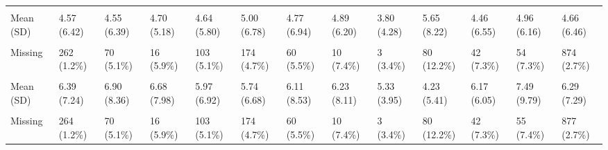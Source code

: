 \documentclass[
  single column]{article}
\begin{document}
\begin{landscape}
\begin{longtable}[t]{lllllllllllll}
\cellcolor{gray!10}{hours\_commute} & \cellcolor{gray!10}{} & \cellcolor{gray!10}{} & \cellcolor{gray!10}{} & \cellcolor{gray!10}{} & \cellcolor{gray!10}{} & \cellcolor{gray!10}{} & \cellcolor{gray!10}{} & \cellcolor{gray!10}{} & \cellcolor{gray!10}{} & \cellcolor{gray!10}{} & \cellcolor{gray!10}{} & \cellcolor{gray!10}{}\\
\addlinespace
Mean (SD) & 4.57 (6.42) & 4.55 (6.39) & 4.70 (5.18) & 4.64 (5.80) & 5.00 (6.78) & 4.77 (6.94) & 4.89 (6.20) & 3.80 (4.28) & 5.65 (8.22) & 4.46 (6.55) & 4.96 (6.16) & 4.66 (6.46)\\
\cellcolor{gray!10}{Median [Min, Max]} & \cellcolor{gray!10}{3.00 [0, 160]} & \cellcolor{gray!10}{3.00 [0, 100]} & \cellcolor{gray!10}{3.00 [0, 40.0]} & \cellcolor{gray!10}{3.00 [0, 100]} & \cellcolor{gray!10}{3.50 [0, 100]} & \cellcolor{gray!10}{3.00 [0, 100]} & \cellcolor{gray!10}{3.75 [0, 50.0]} & \cellcolor{gray!10}{3.00 [0, 25.0]} & \cellcolor{gray!10}{3.50 [0, 100]} & \cellcolor{gray!10}{3.00 [0, 80.0]} & \cellcolor{gray!10}{3.00 [0, 60.0]} & \cellcolor{gray!10}{3.00 [0, 160]}\\
Missing & 262 (1.2\%) & 70 (5.1\%) & 16 (5.9\%) & 103 (5.1\%) & 174 (4.7\%) & 60 (5.5\%) & 10 (7.4\%) & 3 (3.4\%) & 80 (12.2\%) & 42 (7.3\%) & 54 (7.3\%) & 874 (2.7\%)\\
\cellcolor{gray!10}{hours\_exercise} & \cellcolor{gray!10}{} & \cellcolor{gray!10}{} & \cellcolor{gray!10}{} & \cellcolor{gray!10}{} & \cellcolor{gray!10}{} & \cellcolor{gray!10}{} & \cellcolor{gray!10}{} & \cellcolor{gray!10}{} & \cellcolor{gray!10}{} & \cellcolor{gray!10}{} & \cellcolor{gray!10}{} & \cellcolor{gray!10}{}\\
Mean (SD) & 6.39 (7.24) & 6.90 (8.36) & 6.68 (7.98) & 5.97 (6.92) & 5.74 (6.68) & 6.11 (8.53) & 6.23 (8.11) & 5.33 (3.95) & 4.23 (5.41) & 6.17 (6.05) & 7.49 (9.79) & 6.29 (7.29)\\
\addlinespace
\cellcolor{gray!10}{Median [Min, Max]} & \cellcolor{gray!10}{5.00 [0, 80.0]} & \cellcolor{gray!10}{5.00 [0, 80.0]} & \cellcolor{gray!10}{5.00 [0, 80.0]} & \cellcolor{gray!10}{5.00 [0, 80.0]} & \cellcolor{gray!10}{4.00 [0, 80.0]} & \cellcolor{gray!10}{4.00 [0, 80.0]} & \cellcolor{gray!10}{5.00 [0, 80.0]} & \cellcolor{gray!10}{5.00 [0, 16.0]} & \cellcolor{gray!10}{3.00 [0, 50.0]} & \cellcolor{gray!10}{5.00 [0, 36.0]} & \cellcolor{gray!10}{5.00 [0, 80.0]} & \cellcolor{gray!10}{5.00 [0, 80.0]}\\
Missing & 264 (1.2\%) & 70 (5.1\%) & 16 (5.9\%) & 103 (5.1\%) & 174 (4.7\%) & 60 (5.5\%) & 10 (7.4\%) & 3 (3.4\%) & 80 (12.2\%) & 42 (7.3\%) & 55 (7.4\%) & 877 (2.7\%)\\

\end{longtable}
\end{landscape}
\end{document}
